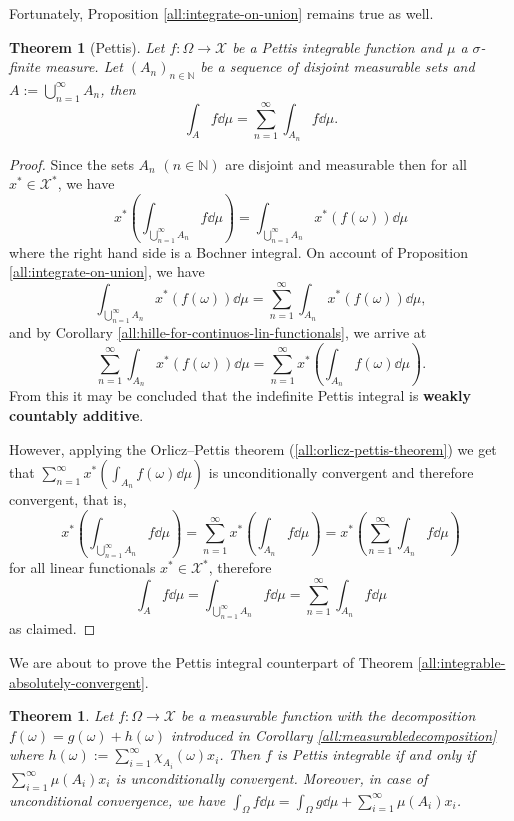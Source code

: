 \documentclass[a4paper, 12pt]{article}
\newtheorem{theo}[lem]{Theorem}
\begin{document}
Fortunately, Proposition \ref{all:integrate-on-union} remains true as well.
\begin{theo}[Pettis]\label{all:indefinite-pettis-integral-countably-additive} Let $f\colon \Omega \rightarrow \mathcal{X}$ be a Pettis integrable function and $\mu$ a $\sigma$-finite measure. Let $(A_n)_{n \in \mathbb{N}}$ be a sequence of disjoint measurable sets and $A := \bigcup\limits^{\infty}_{n=1} A_n$, then
$$
\int_{A} f \dd{\mu} = \sum^{\infty}_{n=1} \int_{A_n} f \dd{\mu}.
$$
\end{theo}
\begin{proof} Since the sets $A_n$ $(n \in \mathbb{N})$ are disjoint and measurable then for all $x^* \in \mathcal{X}^*$, we have
$$
x^*\left(\int_{\bigcup^{\infty}_{n=1} A_n} f \dd{\mu} \right) = \int_{\bigcup^{\infty}_{n=1} A_n} x^*(f(\omega)) \dd{\mu}
$$
where the right hand side is a Bochner integral. On account of Proposition \ref{all:integrate-on-union}, we have
$$
\int_{\bigcup^{\infty}_{n=1} A_n} x^*(f(\omega)) \dd{\mu} = \sum^{\infty}_{n=1} \int_{A_n} x^*(f(\omega)) \dd{\mu},
$$
and by Corollary \ref{all:hille-for-continuos-lin-functionals}, we arrive at
$$
\sum^{\infty}_{n=1} \int_{A_n} x^*(f(\omega)) \dd{\mu} = \sum^{\infty}_{n=1} x^*\left(\int_{A_n} f(\omega) \dd{\mu} \right).
$$
From this it may be concluded that the indefinite Pettis integral is \textbf{weakly countably additive}.

However, applying the Orlicz\---Pettis theorem (\ref{all:orlicz-pettis-theorem}) we get that $\sum\limits^{\infty}_{n=1} x^*\left(\int_{A_n} f(\omega) \dd{\mu} \right)$ is unconditionally convergent and therefore convergent, that is,
$$
x^*\left(\int_{\bigcup^{\infty}_{n=1} A_n} f \dd{\mu} \right) = \sum^{\infty}_{n=1} x^*\left(\int_{A_n} f \dd{\mu} \right) = x^*\left(\sum^{\infty}_{n=1} \int_{A_n} f \dd{\mu}\right)
$$
for all linear functionals $x^* \in \mathcal{X}^*$, therefore
$$
\int_{A} f \dd{\mu} = \int_{\bigcup^{\infty}_{n=1} A_n} f \dd{\mu} = \sum^{\infty}_{n=1} \int_{A_n} f \dd{\mu}
$$
as claimed.
\end{proof}
We are about to prove the Pettis integral counterpart of Theorem \ref{all:integrable-absolutely-convergent}.
\begin{theo}\label{all:pettis-integrable-unconditionally-convergent}Let $f\colon \Omega \to \mathcal{X}$ be a measurable function with the decomposition $f(\omega)=g(\omega)+h(\omega)$ introduced in Corollary \ref{all:measurabledecomposition} where $h(\omega) := \sum^{\infty}_{i=1} \chi_{A_i}(\omega) x_i$. Then $f$ is Pettis integrable if and only if $\sum^{\infty}_{i=1}\mu(A_i) x_i$ is unconditionally convergent. Moreover, in case of unconditional convergence, we have $\int_{\Omega} f \dd{\mu} = \int_{\Omega} g \dd{\mu} + \sum^{\infty}_{i=1}\mu(A_i) x_i$.
\end{theo}
\end{document}
